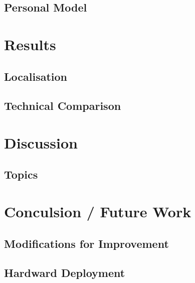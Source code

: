 \documentclass[a4paper]{article}
\begin{document}
\subsection{Personal Model}

\section{Results}
\subsection{Localisation}
\subsection{Technical Comparison}

\section{Discussion}

\subsection{Topics}

\section{Conculsion / Future Work}
\subsection{Modifications for Improvement}
\subsection{Hardward Deployment}



\end{document}
